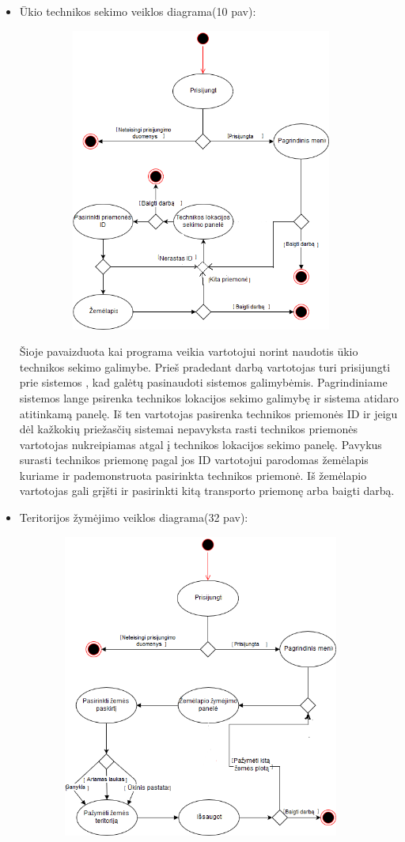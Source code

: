 \documentclass[oneside]{VUMIFPSkursinis}
\begin{document}
\begin{itemize}
\item Ūkio technikos sekimo veiklos diagrama(10 pav):
	\begin{figure}[H]
	\centering	
	\includegraphics[width=10cm,height=10cm,keepaspectratio]{veiklos_diagrama_technikos_sekimas.png}
	\caption{}
	\label{}
	\end{figure}
Šioje pavaizduota kai programa veikia vartotojui norint naudotis ūkio technikos sekimo galimybe. Prieš pradedant darbą vartotojas turi prisijungti prie sistemos , kad galėtų pasinaudoti sistemos galimybėmis. Pagrindiniame sistemos lange psirenka technikos lokacijos sekimo galimybę ir sistema atidaro atitinkamą panelę. Iš ten vartotojas pasirenka technikos priemonės ID ir jeigu dėl kažkokių priežasčių sistemai nepavyksta rasti technikos priemonės vartotojas nukreipiamas atgal į technikos lokacijos sekimo panelę. Pavykus surasti technikos priemonę pagal jos ID vartotojui parodomas žemėlapis kuriame ir pademonstruota pasirinkta technikos priemonė. Iš žemėlapio vartotojas gali grįšti ir pasirinkti kitą transporto priemonę arba baigti darbą.
\pagebreak
\item Teritorijos žymėjimo veiklos diagrama(32 pav):
	\begin{figure}[H]
	\centering	
	\includegraphics[width=10cm,height=10cm,keepaspectratio]{veiklos_diagrama_zymeti_teritorijas.png}
	\caption{}
	\label{}
	\end{figure}


\end{itemize}
\end{document}

